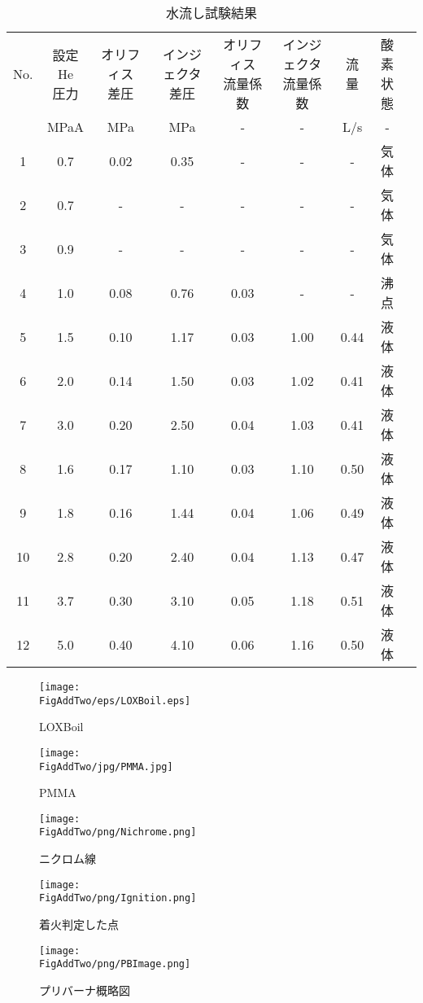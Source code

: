 \begin{table}[htb]
\begin{center}
\caption{水流し試験結果}
\small
\begin{tabular}{|c|c|c|c|c|c|c|c|c|} \hline
No. & \shortstack{設定He\\圧力} & \shortstack{オリフィス\\差圧} & \shortstack{インジェクタ\\差圧} & \shortstack{オリフィス\\流量係数} & \shortstack{インジェクタ\\流量係数} & 流量 & \shortstack{酸素\\状態}  \\ \cline{2-8}
 & MPaA & MPa & MPa & - & - & L/s & - \\ \hline
1 & 0.7 & 0.02 & 0.35 & - & - & - & 気体 \\ \hline
2 & 0.7 & - & - & - & - & - & 気体 \\ \hline
3 & 0.9 & - & - & - & - & - & 気体 \\ \hline
4 & 1.0 & 0.08 & 0.76 & 0.03 & - & - & 沸点 \\ \hline
5 & 1.5 & 0.10 & 1.17 & 0.03 & 1.00 & 0.44 & 液体 \\ \hline
6 & 2.0 & 0.14 & 1.50 & 0.03 & 1.02 & 0.41 & 液体 \\ \hline
7 & 3.0 & 0.20 & 2.50 & 0.04 & 1.03 & 0.41 & 液体 \\ \hline
8 & 1.6 & 0.17 & 1.10 & 0.03 & 1.10 & 0.50 & 液体 \\ \hline
9 & 1.8 & 0.16 & 1.44 & 0.04 & 1.06 & 0.49 & 液体 \\ \hline
10 & 2.8 & 0.20 & 2.40 & 0.04 & 1.13 & 0.47 & 液体 \\ \hline
11 & 3.7 & 0.30 & 3.10 & 0.05 & 1.18 & 0.51 & 液体 \\ \hline
12 & 5.0 & 0.40 & 4.10 & 0.06 & 1.16 & 0.50 & 液体 \\ \hline
\end{tabular}
\label{tab:LOX}
\end{center}
\end{table}
\begin{figure}
\centering
\texttt{[image: \\FigAddTwo/eps/LOXBoil.eps]}
\caption{LOXBoil}
\label{fig:LOXBoil}
\end{figure}
\begin{figure}[htbp]
\centering
\texttt{[image: \\FigAddTwo/jpg/PMMA.jpg]}
\caption{PMMA}
\label{fig:PMMA}
\end{figure}
\begin{figure}
\centering
\texttt{[image: \\FigAddTwo/png/Nichrome.png]}
\caption{ニクロム線}
\label{fig:Nichrome}
\end{figure}
\begin{figure}
\centering
\texttt{[image: \\FigAddTwo/png/Ignition.png]}
\caption{着火判定した点}
\label{fig:Ignition}
\end{figure}
\begin{figure}
\centering
\texttt{[image: \\FigAddTwo/png/PBImage.png]}
\caption{プリバーナ概略図}
\label{fig:PBOut}
\end{figure}

